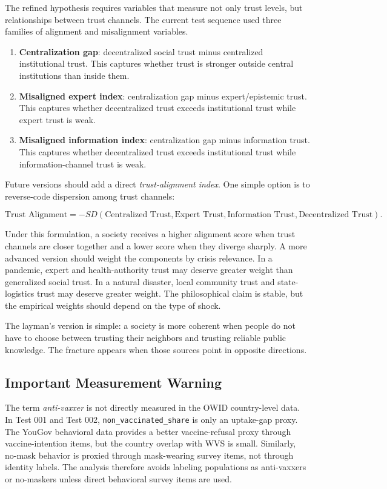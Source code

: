 \documentclass[12pt]{article}
\begin{document}
The refined hypothesis requires variables that measure not only trust levels, but relationships between trust channels. The current test sequence used three families of alignment and misalignment variables.

\begin{enumerate}
  \item \textbf{Centralization gap}: decentralized social trust minus centralized institutional trust. This captures whether trust is stronger outside central institutions than inside them.
  \item \textbf{Misaligned expert index}: centralization gap minus expert/epistemic trust. This captures whether decentralized trust exceeds institutional trust while expert trust is weak.
  \item \textbf{Misaligned information index}: centralization gap minus information trust. This captures whether decentralized trust exceeds institutional trust while information-channel trust is weak.
\end{enumerate}

Future versions should add a direct \textit{trust-alignment index}. One simple option is to reverse-code dispersion among trust channels:

\[
\text{Trust Alignment} =
-SD(
\text{Centralized Trust},
\text{Expert Trust},
\text{Information Trust},
\text{Decentralized Trust}
).
\]

Under this formulation, a society receives a higher alignment score when trust channels are closer together and a lower score when they diverge sharply. A more advanced version should weight the components by crisis relevance. In a pandemic, expert and health-authority trust may deserve greater weight than generalized social trust. In a natural disaster, local community trust and state-logistics trust may deserve greater weight. The philosophical claim is stable, but the empirical weights should depend on the type of shock.

The layman's version is simple: a society is more coherent when people do not have to choose between trusting their neighbors and trusting reliable public knowledge. The fracture appears when those sources point in opposite directions.

\subsection{Important Measurement Warning}

The term \textit{anti-vaxxer} is not directly measured in the OWID country-level data. In Test 001 and Test 002, \texttt{non\_vaccinated\_share} is only an uptake-gap proxy. The YouGov behavioral data provides a better vaccine-refusal proxy through vaccine-intention items, but the country overlap with WVS is small. Similarly, no-mask behavior is proxied through mask-wearing survey items, not through identity labels. The analysis therefore avoids labeling populations as anti-vaxxers or no-maskers unless direct behavioral survey items are used.
\end{document}
